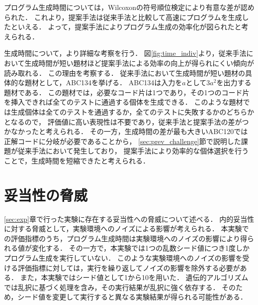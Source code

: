 \documentclass[uplatex,dvipdfmx,a4paper]{jsarticle}
\begin{document}
プログラム生成時間については，Wilcoxonの符号順位検定により有意な差が認められた．
これより，提案手法は従来手法と比較して高速にプログラムを生成したといえる．
よって，提案手法によりプログラム生成の効率化が図られたと考えられる．

生成時間について，より詳細な考察を行う．
図\ref{fig:time_indiv}より，従来手法において生成時間が短い題材ほど提案手法による効率の向上が得られにくい傾向が読み取れる．
この理由を考察する．
従来手法において生成時間が短い題材の具体的な題材として，ABC134を挙げる．
ABC134は入力を$a$として$3a^2$を出力する題材である．
この題材では，必要なコード片は1つであり，その1つのコード片を挿入できれば全てのテストに通過する個体を生成できる．
このような題材では生成個体は全てのテストを通過するか，全てのテストに失敗するかのどちらかとなるので，
評価値に高い表現性は不要であり，従来手法と提案手法の差がつかなかったと考えられる．
その一方，生成時間の差が最も大きいABC120では正解コードに分岐が必要であることから，
\ref{sec:prev_challenge}節で説明した課題が従来手法において発生しており，
提案手法により効率的な個体選択を行うことで，生成時間を短縮できたと考えられる．
%


\clearpage
\section{妥当性の脅威}
\ref{sec:exp}章で行った実験に存在する妥当性への脅威について述べる．
内的妥当性に対する脅威として，実験環境へのノイズによる影響が考えられる．
本実験での評価指標のうち，プログラム生成時間は実験環境へのノイズの影響により得られる値が変化する．
その一方で，本実験では1つの乱数シード値につき1度しかプログラム生成を実行していない．
このような実験環境へのノイズの影響を受ける評価指標に対しては，実行を繰り返してノイズの影響を除外する必要がある．
また，本実験ではシード値として1から10を用いた．
遺伝的アルゴリズムでは乱択に基づく処理を含み，その実行結果が乱択に強く依存する．
そのため，シード値を変更して実行すると異なる実験結果が得られる可能性がある．
\end{document}
